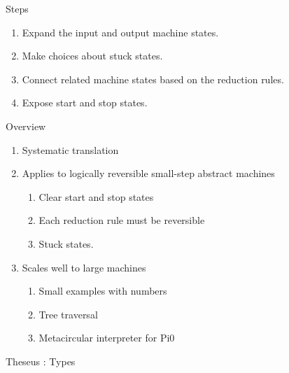 \documentclass[svgnames,11pt]{beamer}
\begin{document}
\begin{frame}{Steps}

  \begin{enumerate}
\vfill
\item Expand the input and output machine states.
\vfill
\item Make choices about stuck states. 
\vfill
\item Connect related machine states based on the reduction rules.
\vfill
\item Expose start and stop states. 
  \end{enumerate}
\vfill

\end{frame}


\begin{frame}{Overview}

  \begin{enumerate}
\vfill
  \item Systematic translation
\vfill
  \item Applies to logically reversible small-step abstract machines
    \begin{enumerate}
    \item Clear start and stop states
    \item Each reduction rule must be reversible
    \item Stuck states.
    \end{enumerate}
\vfill
  \item Scales well to large machines
    \begin{enumerate}
    \item Small examples with numbers
    \item Tree traversal
    \item Metacircular interpreter for {{Pi0}}
    \end{enumerate}

  \end{enumerate}
\vfill

\end{frame}


\begin{frame}[fragile]{Theseus : Types}

%
%

\end{frame}
\end{document}
